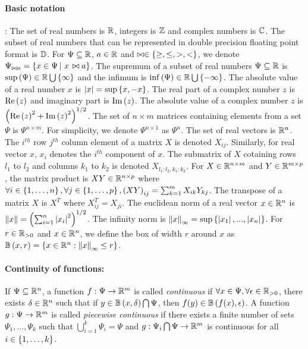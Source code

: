\paragraph{Basic notation}:  The set of real numbers is $\mathbb{R}$,
integers is $\mathbb{Z}$ and complex numbers is $\mathbb{C}$.  The subset
of real numbers that can be represented in double precision floating
point format is $\mathbb{D}$.  For $\Psi\subseteq\mathbb{R}$, $a\in\mathbb{R}$
and $\bowtie\in\left\{\geq,\leq,>,<\right\}$, we denote $\Psi_{\bowtie a}
= \left\{ x\in\Psi \left|~x\right. \bowtie a \right\}$.  The supremum of a subset of real
numbers $\Psi\subseteq\mathbb{R}$ is
$\sup\left(\Psi\right)\in\mathbb{R}\bigcup\left\{\infty\right\}$ and the infimum is
$\inf\left(\Psi\right)\in\mathbb{R}\bigcup\left\{-\infty\right\}$.  The absolute value of a
real number $x$ is $\left|x\right| = \sup\left\{x,-x\right\}$.  The real part of a
complex number $z$ is $\operatorname{Re}\left(z\right)$ and imaginary part is $\operatorname{Im}\left(z\right)$.  The
absolute value of a complex number $z$ is $\left(\operatorname{Re}\left(z\right)^2
+ \operatorname{Im}\left(z\right)^2\right)^{1/2}$.  %
The set of $n\times m$ matrices containing elements from a set $\Psi$
is $\Psi^{n\times m}$.  For simplicity, we denote $\Psi^{n\times 1}$
as $\Psi^n$.  The set of real vectors is $\mathbb{R}^n$.  The $i^{th}$ row
$j^{th}$ column element of a matrix $X$ is denoted $X_{ij}$.
Similarly, for real vector $x$, $x_i$ denotes the $i^{th}$ component
of $x$.  The submatrix of $X$ cotaining rows $l_1$ to $l_2$ and
columns $k_1$ to $k_2$ is denoted $X_{l_1:l_2,k_1:k_2}$.  For
$X\in\mathbb{R}^{n\times m}$ and $Y\in\mathbb{R}^{m\times p}$, the matrix
product is $XY\in\mathbb{R}^{n\times p}$ where $\forall
i\in\left\{1,\ldots,n\right\},\forall j\in\left\{1,\ldots,p\right\},\left(XY\right)_{ij}
= \sum_{k=1}^{m}X_{ik}Y_{kj}$.  The transpose of a matrix $X$ is $X^T$
where $X^T_{ij} = X_{ji}$.  The euclidean norm of a real vector
$x\in\mathbb{R}^n$ is $\left\|x\right\| = \left(\sum_{i=1}^n\left|x_i\right|^2\right)^{1/2}$.
The infinity norm is $\left\|x\right\|_\infty
= \sup\left\{\left|x_1\right|,...,\left|x_n\right|\right\}$.  For $r\in\mathbb{R}_{> 0}$ and
$x\in\mathbb{R}^n$, we define the box of width $r$ around $x$ as
$\mathbb{B}\left(x,r\right) = \left\{ x\in\mathbb{R}^n: \left\|x\right\|_\infty \leq r \right\}$.
%
\paragraph{Continuity of functions:} If $\Psi\subseteq\mathbb{R}^n$, a
function $f:\Psi\rightarrow\mathbb{R}^m$ is called \emph{continuous} if
$\forall x\in\Psi,\forall\epsilon\in\mathbb{R}_{>0}$, there exists
$\delta\in\mathbb{R}^n$ such that if $y\in\mathbb{B}\left(x,\delta\right)\bigcap\Psi$,
then $f(y)\in\mathbb{B}\left(f(x),\epsilon\right)$.  A function
$g:\Psi\rightarrow\mathbb{R}^m$ is called \emph{piecewise continuous} if
there exists a finite number of sets $\Psi_1,\ldots,\Psi_k$ such that
$\bigcup_{i=1}^k\Psi_i=\Psi$ and
$g:\Psi_i\bigcap\Psi\rightarrow \mathbb{R}^m$ is continuous for all
$i\in\left\{1,\ldots,k\right\}$.
%
